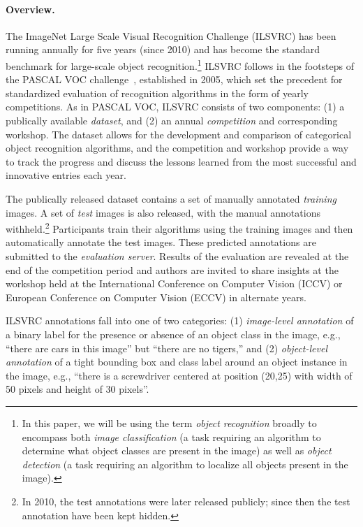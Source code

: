 \paragraph{Overview.} The ImageNet Large Scale Visual Recognition Challenge (ILSVRC) has been running annually for five years (since 2010) and has
become the standard benchmark for large-scale object recognition.\footnote{In this paper, we will be using the term \emph{object recognition}
broadly to encompass  both \emph{image classification} (a task requiring an algorithm to determine what object classes are present in the image) as well as \emph{object detection} (a task
requiring an algorithm to localize all objects present in the image).}
 ILSVRC follows in the footsteps of
the PASCAL VOC challenge~\citep{PASCALVOC}, established in 2005, which set the precedent for 
standardized evaluation of recognition algorithms in the form of yearly competitions. As in PASCAL VOC, ILSVRC consists of two components:
(1) a publically available \emph{dataset}, and (2) an annual \emph{competition} and corresponding workshop.
The dataset allows for the development and comparison of categorical object recognition algorithms, and the
competition and workshop provide a way to track the progress and discuss the lessons learned from the most successful and innovative
entries each year.

The publically released dataset contains a  set of manually annotated \emph{training} images. A set of \emph{test} images is also released, with the manual annotations withheld.\footnote{ In 2010, the test annotations were later released publicly;
since then the test annotation have been kept hidden.} Participants train their algorithms using the training images and then automatically annotate the test images. These predicted annotations are submitted to the  \emph{evaluation server}. Results of the evaluation are revealed at the end of the competition period and authors are invited to share insights at the workshop held at the International Conference on Computer Vision (ICCV) or European Conference on Computer Vision (ECCV) in alternate years. 

ILSVRC annotations fall into one of two categories: (1) \emph{image-level annotation} of a binary label for the presence or absence of an object class in the image, e.g., ``there are cars in this image'' but ``there are no tigers,'' and (2) \emph{object-level annotation} of a tight bounding box and class label around an object instance in the image, e.g., ``there is a screwdriver centered at position (20,25) with width of 50 pixels and height of 30 pixels''.  

